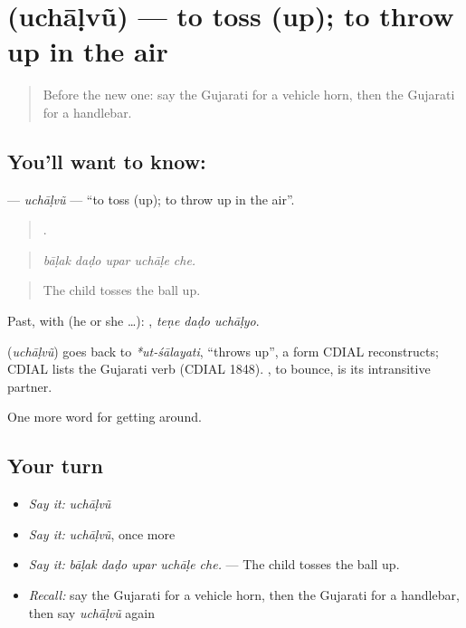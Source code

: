 \section[\texorpdfstring{\gu{ઉછાળવું} (uchāḷvũ)}{ઉછાળવું (uchāḷvũ)}]{ (uchāḷvũ) — to toss (up); to throw up in the air}

\label{lesson:GU-C400-uchalvu-toss}



\begin{quote}
Before the new one: say the Gujarati for a vehicle horn, then the Gujarati for a handlebar.
\end{quote}

\subsection*{You'll want to know: }
\textbf{} — \emph{uchāḷvũ} — \textquotedblleft{}to toss (up); to throw up in the air\textquotedblright{}.

\begin{quote}
    .
\end{quote}

\begin{quote}
\emph{bāḷak daḍo upar uchāḷe che.}
\end{quote}

\begin{quote}
The child tosses the ball up.
\end{quote}

Past, with  (he or she …):   , \emph{teṇe daḍo uchāḷyo}.

\begin{cousinweb}
\textbf{} (\emph{uchāḷvũ}) goes back to \emph{*ut-śālayati}, \textquotedblleft{}throws up\textquotedblright{}, a form CDIAL reconstructs; CDIAL lists the Gujarati verb (CDIAL 1848). , to bounce, is its intransitive partner.
\end{cousinweb}

\begin{grammarlens}[title={What you've built}]
One more word for getting around.
\end{grammarlens}

\subsection*{Your turn}
\begin{itemize}
\raggedright
  \item \emph{Say it:} \emph{uchāḷvũ}
  \item \emph{Say it:} \emph{uchāḷvũ}, once more
  \item \emph{Say it:} \emph{bāḷak daḍo upar uchāḷe che.} — The child tosses the ball up.
  \item \emph{Recall:} say the Gujarati for a vehicle horn, then the Gujarati for a handlebar, then say \emph{uchāḷvũ} again
\end{itemize}

